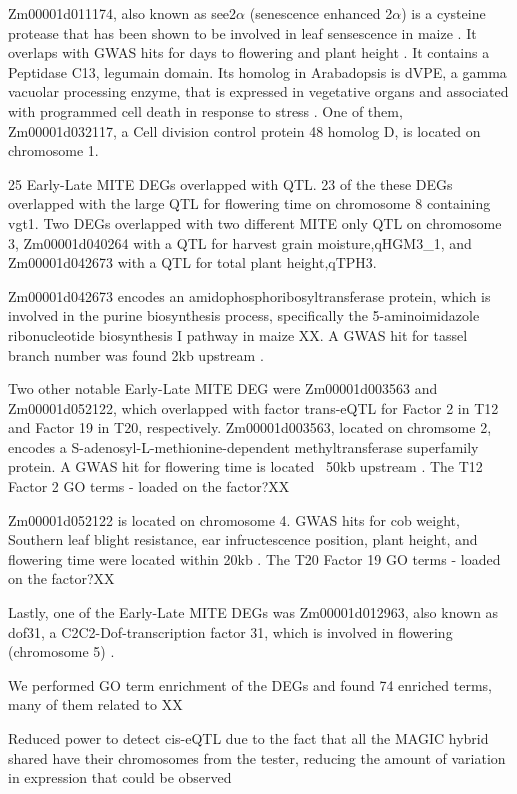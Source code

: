 \documentclass[article,9pt,twocolumn,twoside]{rilabRxiv}
\begin{document}
Zm00001d011174, also known as see2$\alpha$ (senescence enhanced 2$\alpha$) is a cysteine protease that has been shown to be involved in leaf sensescence in maize \citep{Zhang4}.
It overlaps with GWAS hits for days to flowering and plant height \citep{Peiffer,Peiffer2}.
It contains a Peptidase C13, legumain domain.
Its homolog in Arabadopsis is dVPE, a gamma vacuolar processing enzyme, that is expressed in vegetative organs and associated with programmed cell death in response to stress \citep{Wang6,Reis}.
One of them, Zm00001d032117, a Cell division control protein 48 homolog D, is located on chromosome 1.

25 Early-Late MITE DEGs overlapped with QTL.
23 of the these DEGs overlapped with the large QTL for flowering time on chromosome 8 containing vgt1.
Two DEGs overlapped with two different MITE only QTL on chromosome 3, Zm00001d040264 with a QTL for harvest grain moisture,qHGM3\_1, and Zm00001d042673 with a QTL for total plant height,qTPH3.

Zm00001d042673 encodes an amidophosphoribosyltransferase protein, which is involved in the purine biosynthesis process, specifically the 5-aminoimidazole ribonucleotide biosynthesis I pathway in maize XX. 
A GWAS hit for tassel branch number was found 2kb upstream \citep{Li6}.

Two other notable Early-Late MITE DEG were Zm00001d003563 and Zm00001d052122, which overlapped with factor trans-eQTL for Factor 2 in T12 and Factor 19 in T20, respectively.
Zm00001d003563, located on chromsome 2, encodes a S-adenosyl-L-methionine-dependent methyltransferase superfamily protein.
A GWAS hit for flowering time is located ~50kb upstream \citep{Li6}.
The T12 Factor 2 GO terms - loaded on the factor?XX

Zm00001d052122 is located on chromosome 4.
GWAS hits for cob weight, Southern leaf blight resistance, ear infructescence position, plant height, and flowering time were located within 20kb \citep{Peiffer,Kusmec,Kump}.
The T20 Factor 19 GO terms - loaded on the factor?XX

Lastly, one of the Early-Late MITE DEGs was Zm00001d012963, also known as dof31, a C2C2-Dof-transcription factor 31, which is involved in flowering (chromosome 5) \citep{Li4}.

We performed GO term enrichment of the DEGs and found 74 enriched terms, many of them related to XX

Reduced power to detect cis-eQTL due to the fact that all the MAGIC hybrid shared have their chromosomes from the tester, reducing the amount of variation in expression that could be observed 
\end{document}
